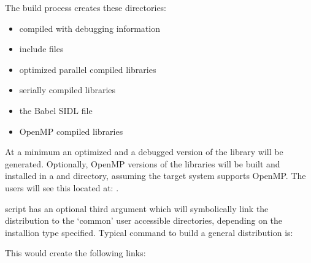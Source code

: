 \begin{enumerate}
   The build process creates these directories:
      \begin{itemize}
       \item {}   compiled with debugging information
       \item {} include files
       \item {}     optimized parallel compiled libraries
       \item {}  serially compiled libraries
       \item {}   the Babel SIDL file
       \item {} OpenMP compiled libraries
      \end{itemize}

   At a minimum an optimized and a debugged version of the library will be 
   generated. Optionally, OpenMP versions of the libraries will be built and
   installed in a  and  directory, assuming
   the target system supports OpenMP. The users will see this located at: 
   .

    script has an optional third argument  which will
   symbolically link the distribution to the `common' user accessible directories,
   depending on the installion type specified. Typical command to build a general
   distribution is:\linebreak
   \linebreak

   This would create the following links:\linebreak
   \linebreak
   \linebreak
   \linebreak
   \linebreak
   \linebreak
   \linebreak
   \linebreak
   \linebreak
   \linebreak


\end{enumerate}
